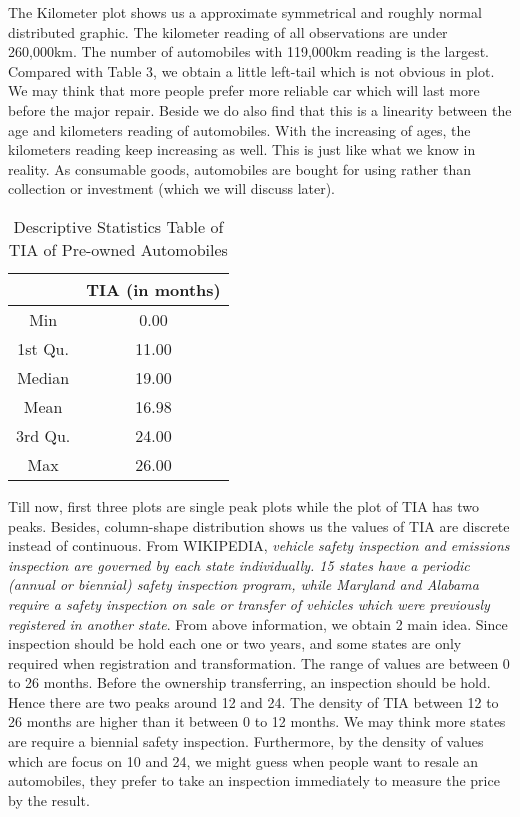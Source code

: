 \documentclass[a4paper]{article}
\begin{document}
\noindent
The Kilometer plot shows us a approximate symmetrical and roughly normal distributed graphic. The kilometer reading of all observations are under 260,000km. The number of automobiles with 119,000km reading is the largest. Compared with Table 3, we obtain a little left-tail which is not obvious in plot. We may think that more people prefer more reliable car which will last more before the major repair. Beside we do also find that this is a linearity between the age and kilometers reading of automobiles. With the increasing of ages, the kilometers reading keep increasing as well. This is just like what we know in reality. As consumable goods, automobiles are bought for using rather than collection or investment (which we will discuss later).\\

\begin{table}[!htb]
    \centering
    \begin{tabular}{cc}
    \toprule
         &  TIA (in months) \\
    \midrule
        Min  &  0.00 \\ 
         1st Qu.  &  11.00 \\ 
          Median  &  19.00 \\ 
           Mean  &  16.98 \\ 
            3rd Qu.  &  24.00 \\ 
             Max  &  26.00 \\ 
    \bottomrule
    \end{tabular}
    \caption{Descriptive Statistics Table of TIA of Pre-owned Automobiles}
    \label{tab:my_label}
\end{table}

\noindent
Till now, first three plots are single peak plots while the plot of TIA has two peaks. Besides, column-shape distribution shows us the values of TIA are discrete instead of continuous. From WIKIPEDIA, \textit{vehicle safety inspection and emissions inspection are governed by each state individually. 15 states have a periodic (annual or biennial) safety inspection program, while Maryland and Alabama require a safety inspection on sale or transfer of vehicles which were previously registered in another state}. From above information, we obtain 2 main idea. Since inspection should be hold each one or two years, and some states are only required when registration and transformation. The range of values are between 0 to 26 months. Before the ownership transferring, an inspection should be hold. Hence there are two peaks around 12 and 24. The density of TIA between 12 to 26 months are higher than it between 0 to 12 months. We may think more states are require a biennial safety inspection. Furthermore, by the density of values which are focus on 10 and 24, we might guess when people want to resale an automobiles, they prefer to take an inspection immediately to measure the price by the result. \\
\end{document}
